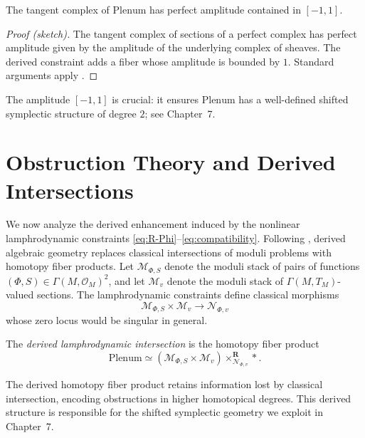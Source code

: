 \begin{proposition}
The tangent complex of $\mathrm{Plenum}$ has perfect amplitude
contained in $[-1,1]$.
\end{proposition}

\begin{proof}[Proof (sketch)]
The tangent complex of sections of a perfect complex has perfect
amplitude given by the amplitude of the underlying complex of sheaves.
The derived constraint adds a fiber whose amplitude is bounded by $1$.
Standard arguments apply \cite{Lurie-DAG}.
\end{proof}

\begin{remark}
The amplitude $[-1,1]$ is crucial: it ensures $\mathrm{Plenum}$ has
a well-defined shifted symplectic structure of degree $2$; see Chapter~7.
\end{remark}

\section{Obstruction Theory and Derived Intersections}

We now analyze the derived enhancement induced by the nonlinear
lamphrodynamic constraints
\eqref{eq:R-Phi}--\eqref{eq:compatibility}.
Following \cite{ToenVezzosi-HAGII}, derived algebraic geometry replaces
classical intersections of moduli problems with homotopy fiber products.
Let $\mathcal{M}_{\Phi,S}$ denote the moduli stack of pairs of functions
$(\Phi,S)\in\Gamma(M,\mathcal{O}_M)^2$, and let $\mathcal{M}_{v}$ denote
the moduli stack of $\Gamma(M,T_M)$-valued sections.
The lamphrodynamic constraints define classical morphisms
\[
\mathcal{M}_{\Phi,S}\times \mathcal{M}_{v}
\longrightarrow \mathcal{N}_{\Phi,v}
\]
whose zero locus would be singular in general.

\begin{definition}
The \emph{derived lamphrodynamic intersection} is the homotopy fiber
product
\[
\mathrm{Plenum}
\simeq
(\mathcal{M}_{\Phi,S}\times \mathcal{M}_{v})
\times^{\mathbf{R}}_{\mathcal{N}_{\Phi,v}} \ast.
\]
\end{definition}

\begin{remark}
The derived homotopy fiber product retains information lost by
classical intersection, encoding obstructions in higher homotopical
degrees. This derived structure is responsible for the shifted
symplectic geometry we exploit in Chapter~7.
\end{remark}


